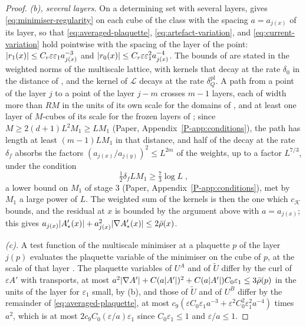 \documentclass[11pt]{preprint}
\DeclarePairedDelimiter{\abs}{\lvert}{\rvert}
\numberwithin{equation}{section}
\theoremstyle{definition}
\theoremstyle{remark}
\theoremstyle{plain}
\begin{document}
\begin{proof}
\emph{(b), several layers.} On a determining set with several layers, \cite[Theorem~1, (9)--(10), p.~279]{BalabanVAR} gives \eqref{eq:minimiser-regularity} on each cube of the class with the spacing $a = a_{j(x)}$ of its layer, so that \eqref{eq:averaged-plaquette}, \eqref{eq:artefact-variation}, and \eqref{eq:current-variation} hold pointwise with the spacing of the layer of the point: $\abs{r_1(x)} \leq C_r\varepsilon\varepsilon_1a_{j(x)}^{-3}$ and $\abs{r_0(x)} \leq C_r\varepsilon\varepsilon_1^2a_{j(x)}^{-4}$. The bounds of \cite[Theorem~3.13]{BalabanPBG} are stated in the weighted norms of the multiscale lattice, with kernels that decay at the rate $\delta_0$ in the distance of \cite[(2.46)]{BalabanPRT2}, and the kernel of $\mathcal L$ decays at the rate $\delta^{\mathrm{pl}}_Q$. A path from a point of the layer $j$ to a point of the layer $j - m$ crosses $m - 1$ layers, each of width more than $RM$ in the units of its own scale for the domains of \cite[(2.2), p.~224]{BalabanPRT2}, and at least one layer of $M$-cubes of its scale for the frozen layers of \cite[p.~179, ll.~21--24]{BalabanLFR1}; since $M \geq 2(d + 1)L^2M_1 \geq LM_1$ (Paper, Appendix~\ref{P-app:conditions}), the path has length at least $(m - 1)LM_1$ in that distance, and half of the decay at the rate $\delta_f$ absorbs the factors $(a_{j(x)}/a_{j(y)})^2 \leq L^{2m}$ of the weights, up to a factor $L^{7/3}$, under the condition
\begin{equation}\label{eq:frozen-width-condition}
    \tfrac12\delta_fLM_1 \geq \tfrac73\log L\;,
\end{equation}
a lower bound on $M_1$ of stage $3$ (Paper, Appendix~\ref{P-app:conditions}), met by $M_1$ a large power of $L$. The weighted sum of the kernels is then the one which $c_{\mathcal K}$ bounds, and the residual at $x$ is bounded by the argument above with $a = a_{j(x)}$; this gives $a_{j(x)}\abs{A'_*(x)} + a_{j(x)}^2\abs{\nabla A'_*(x)} \leq 2\bar\rho(x)$.

\emph{(c).} A test function of the multiscale minimiser at a plaquette $p$ of the layer $j(p)$ evaluates the plaquette variable of the minimiser on the cube of $p$, at the scale of that layer \cite[(1.22)--(1.24), (1.27), pp.~181--182; (1.75), p.~193]{BalabanLFR1}. The plaquette variables of $U^A$ and of $\tilde U$ differ by the curl of $\varepsilon A'$ with transports, at most $a^2\abs{\nabla A'} + C(a\abs{A'})^2 + C(a\abs{A'})C_0\varepsilon_1 \leq 3\bar\rho(p)$ in the units of the layer for $\varepsilon_1$ small, by (b), and those of $\tilde U$ and of $U^B$ differ by the remainder of \eqref{eq:averaged-plaquette}, at most $c_9(\varepsilon C_0\varepsilon_1a^{-3} + \varepsilon^2C_0^2\varepsilon_1^2a^{-4})$ times $a^2$, which is at most $2c_9C_0(\varepsilon/a)\varepsilon_1$ since $C_0\varepsilon_1 \leq 1$ and $\varepsilon/a \leq 1$.


\end{proof}
\end{document}
